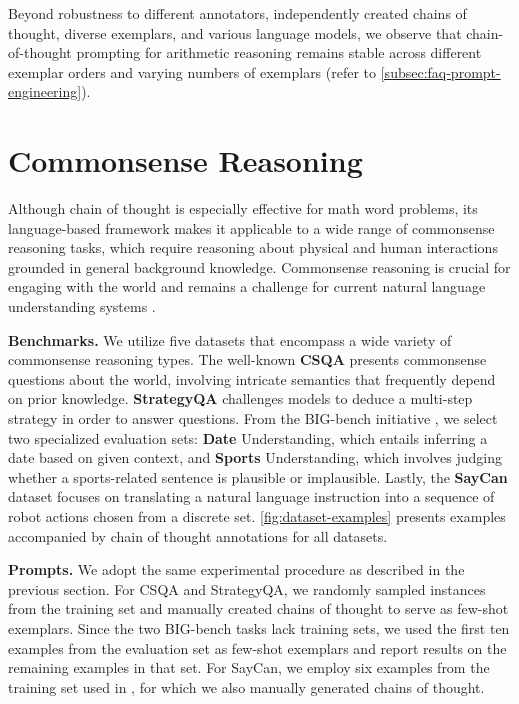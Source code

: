 Beyond robustness to different annotators, independently created chains of thought, diverse exemplars, and various language models, we observe that chain-of-thought prompting for arithmetic reasoning remains stable across different exemplar orders and varying numbers of exemplars (refer to \cref{subsec:faq-prompt-engineering}).

\section{Commonsense Reasoning}\label{sec:commonsense-reasoning}

Although chain of thought is especially effective for math word problems, its language-based framework makes it applicable to a wide range of commonsense reasoning tasks, which require reasoning about physical and human interactions grounded in general background knowledge. Commonsense reasoning is crucial for engaging with the world and remains a challenge for current natural language understanding systems \citep{talmor2022commonsenseqa}.

\textbf{Benchmarks.}  
We utilize five datasets that encompass a wide variety of commonsense reasoning types. The well-known \textbf{CSQA} \citep{talmor-etal-2019-commonsenseqa} presents commonsense questions about the world, involving intricate semantics that frequently depend on prior knowledge.  
\textbf{StrategyQA} \citep{geva-etal-2021-aristotle} challenges models to deduce a multi-step strategy in order to answer questions. From the BIG-bench initiative \citep{bigbench}, we select two specialized evaluation sets: \textbf{Date} Understanding, which entails inferring a date based on given context, and \textbf{Sports} Understanding, which involves judging whether a sports-related sentence is plausible or implausible. Lastly, the \textbf{SayCan} dataset \citep{ahn2022can} focuses on translating a natural language instruction into a sequence of robot actions chosen from a discrete set.  
\cref{fig:dataset-examples} presents examples accompanied by chain of thought annotations for all datasets.  

\textbf{Prompts.}  
We adopt the same experimental procedure as described in the previous section. For CSQA and StrategyQA, we randomly sampled instances from the training set and manually created chains of thought to serve as few-shot exemplars. Since the two BIG-bench tasks lack training sets, we used the first ten examples from the evaluation set as few-shot exemplars and report results on the remaining examples in that set. For SayCan, we employ six examples from the training set used in \citet{ahn2022can}, for which we also manually generated chains of thought.

